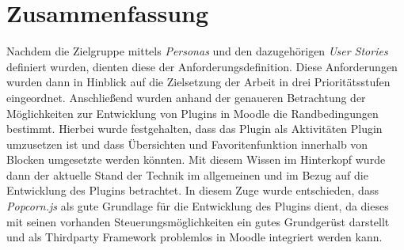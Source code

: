 %
%
%



\section{Zusammenfassung}
Nachdem die Zielgruppe mittels \textit{Personas} und den dazugehörigen \textit{User Stories} definiert wurden, dienten diese der Anforderungsdefinition. Diese Anforderungen wurden dann in Hinblick auf die Zielsetzung der Arbeit in drei Prioritätsstufen eingeordnet. Anschließend wurden anhand der genaueren Betrachtung der Möglichkeiten zur Entwicklung von Plugins in Moodle die Randbedingungen bestimmt. Hierbei wurde festgehalten, dass das Plugin als Aktivitäten Plugin umzusetzen ist und dass Übersichten und Favoritenfunktion innerhalb von Blocken umgesetzte werden könnten. Mit diesem Wissen im Hinterkopf wurde dann der aktuelle Stand der Technik im allgemeinen und im Bezug auf die Entwicklung des Plugins betrachtet. In diesem Zuge wurde entschieden, dass \textit{Popcorn.js} als gute Grundlage für die Entwicklung des Plugins dient, da dieses mit seinen vorhanden Steuerungsmöglichkeiten ein gutes Grundgerüst darstellt und als Thirdparty Framework problemlos in Moodle integriert werden kann.
